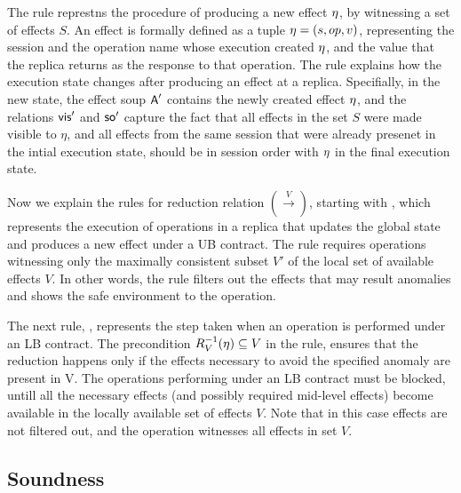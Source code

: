 The rule
 represtns the procedure of producing a new effect $\eta$, by witnessing a set
of effects $S$. 
An effect is formally defined as a tuple $\eta=(s,op,v)$, representing the
session and the operation name 
whose execution created $\eta$, and the value
that the replica returns as the response to that operation.
The rule explains how the execution state changes after producing an
effect at a replica. Specifially, in the new state, the effect soup
${\normalfont \textsf{A}}'$ contains the newly created effect $\eta$, and the relations ${\normalfont \textsf{vis}}'$
and ${\textsf{so}}'$ capture the fact that all effects in the set $S$ were made
visible to $\eta$, and all effects from the same session that were
already presenet in the intial execution state, should be in session
order with $\eta$ in the final execution state.


Now we explain the rules for reduction relation $(\xrightarrow{V})$,
starting with , which represents the execution of operations
in a replica that updates the global state and produces a new
effect under a UB contract. 
The rule requires operations witnessing only the maximally consistent
subset $V'$ of the local set of  available effects $V$. In other words,
the rule filters out the effects that may result anomalies and shows the
safe environment to the operation.

The next rule, , represents the step taken when an
operation is performed under an LB contract. The precondition 
$R_V^{-1}(\eta)\subseteq V$ in the rule, ensures that the reduction
happens only if the effects necessary to avoid the specified anomaly are
present in V. The operations performing under an LB contract must be
blocked, untill all the necessary effects (and possibly required
mid-level effects) become available in the locally available set of
effects $V$. Note that in this case effects are not filtered out, and
the operation witnesses all effects in set $V$.

\subsection{Soundness}
\label{subsec:sound}


